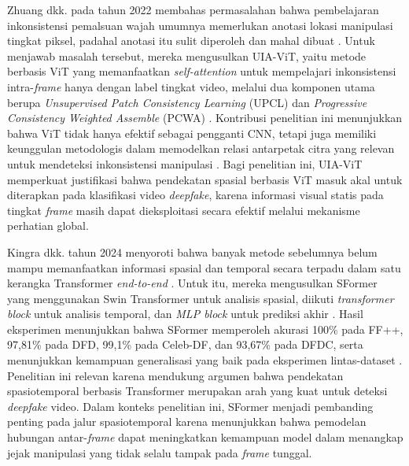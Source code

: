 Zhuang dkk. pada tahun 2022 membahas permasalahan bahwa pembelajaran inkonsistensi pemalsuan wajah umumnya memerlukan anotasi lokasi manipulasi tingkat piksel, padahal anotasi itu sulit diperoleh dan mahal dibuat \cite{zhuang2022uiavitunsupervisedinconsistencyawaremethod}. Untuk menjawab masalah tersebut, mereka mengusulkan UIA-ViT, yaitu metode berbasis ViT yang memanfaatkan \textit{self-attention} untuk mempelajari inkonsistensi intra-\textit{frame} hanya dengan label tingkat video, melalui dua komponen utama berupa \textit{Unsupervised Patch Consistency Learning} (UPCL) dan \textit{Progressive Consistency Weighted Assemble} (PCWA) \cite{zhuang2022uiavitunsupervisedinconsistencyawaremethod}. Kontribusi penelitian ini menunjukkan bahwa ViT tidak hanya efektif sebagai pengganti CNN, tetapi juga memiliki keunggulan metodologis dalam memodelkan relasi antarpetak citra yang relevan untuk mendeteksi inkonsistensi manipulasi \cite{zhuang2022uiavitunsupervisedinconsistencyawaremethod}. Bagi penelitian ini, UIA-ViT memperkuat justifikasi bahwa pendekatan spasial berbasis ViT masuk akal untuk diterapkan pada klasifikasi video \textit{deepfake}, karena informasi visual statis pada tingkat \textit{frame} masih dapat dieksploitasi secara efektif melalui mekanisme perhatian global. \par

Kingra dkk. tahun 2024 menyoroti bahwa banyak metode sebelumnya belum mampu memanfaatkan informasi spasial dan temporal secara terpadu dalam satu kerangka Transformer \textit{end-to-end} \cite{KINGRA2024301817}. Untuk itu, mereka mengusulkan SFormer yang menggunakan Swin Transformer untuk analisis spasial, diikuti \textit{transformer block} untuk analisis temporal, dan \textit{MLP block} untuk prediksi akhir \cite{KINGRA2024301817}. Hasil eksperimen menunjukkan bahwa SFormer memperoleh akurasi 100\% pada FF++, 97,81\% pada DFD, 99,1\% pada Celeb-DF, dan 93,67\% pada DFDC, serta menunjukkan kemampuan generalisasi yang baik pada eksperimen lintas-dataset \cite{KINGRA2024301817}. Penelitian ini relevan karena mendukung argumen bahwa pendekatan spasiotemporal berbasis Transformer merupakan arah yang kuat untuk deteksi \textit{deepfake} video. Dalam konteks penelitian ini, SFormer menjadi pembanding penting pada jalur spasiotemporal karena menunjukkan bahwa pemodelan hubungan antar-\textit{frame} dapat meningkatkan kemampuan model dalam menangkap jejak manipulasi yang tidak selalu tampak pada \textit{frame} tunggal. \par

